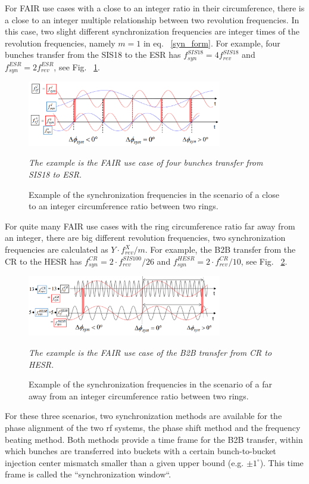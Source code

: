 For FAIR use cases with a close to an integer ratio in their circumference, there is a close to an integer multiple relationship between two revolution frequencies. In this case, two slight different synchronization frequencies are integer times of the revolution frequencies, namely $m=1$ in eq. ~\ref{syn_form}. For example, four bunches transfer from the SIS18 to the ESR has $f_{\mathit{syn}}^{SIS18}=4f_{\mathit{rev}}^{SIS18}$ and $f_{\mathit{syn}}^{ESR}=2f_{\mathit{rev}}^{ESR}$, see Fig. ~\ref{ESR}. 
\begin{figure}[!htb]
   \centering   
   \includegraphics*[width=85mm]{cir_noint.jpg}
   \caption{Example of the synchronization frequencies in the scenario of a close to an integer circumference ratio between two rings.}
{\textsl{\small{The example is the FAIR use case of four bunches transfer from SIS18 to ESR.}}}
   \label{ESR}
\end{figure} 

For quite many FAIR use cases with the ring circumference ratio far away from an integer, there are big different revolution frequencies, two synchronization frequencies are calculated as $Y\cdot f_\mathit{rev}^{X}/m$. For example, the B2B transfer from the CR to the HESR has $f_{\mathit{syn}}^{CR}=2\cdot f_{\mathit{rev}}^{SIS100}/26$ and $f_{\mathit{syn}}^{HESR}=2\cdot f_{\mathit{rev}}^{CR}/10$, see Fig. ~\ref{CR-HESR}.  
\begin{figure}[!htb]
   \centering   
   \includegraphics*[width=85mm]{CR-HESR.png}
   \caption{Example of the synchronization frequencies in the scenario of a far away from an integer circumference ratio between two rings.}
{\textsl{\small{The example is the FAIR use case of the B2B transfer from CR to HESR.}}}
   \label{CR-HESR}
\end{figure} 

For these three scenarios, two synchronization methods are available for the phase alignment of the two rf systems, the phase shift method and the frequency beating method. Both methods provide a time frame for the B2B transfer, within
which bunches are transferred into buckets with a certain bunch-to-bucket injection center mismatch smaller than a given upper bound (e.g. $\pm1^\circ$). This time frame is called the “synchronization window“. 


